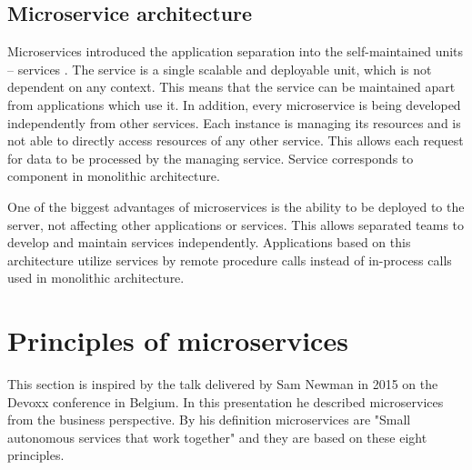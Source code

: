 \documentclass[oneside,
  digital, %
  table,   %
  nolof,     %
  nolot,     %
]{fithesis3}
\begin{document}
\subsection{Microservice architecture}

Microservices introduced the application separation into the self-maintained units – services \cite{intro_to_microservices}. The service is a single scalable and deployable unit, which is not dependent on any context. This means that the service can be maintained apart from applications which use it. In addition, every microservice is being developed independently from other services. Each instance is managing its resources and is not able to directly access resources of any other service. This allows each request for data to be processed by the managing service. Service corresponds to component in monolithic architecture.

One of the biggest advantages of microservices is the ability to be deployed to the server, not affecting other applications or services. This allows separated teams to develop and maintain services independently. Applications based on this architecture utilize services by remote procedure calls instead of in-process calls used in monolithic architecture.

\section{Principles of microservices}

This section is inspired by the talk delivered by Sam Newman \cite{principles_of_microservices} in 2015 on the Devoxx conference in Belgium. In this presentation he described microservices from the business perspective. By his definition microservices are "Small autonomous services that work together" and they are based on these eight principles.
\end{document}
